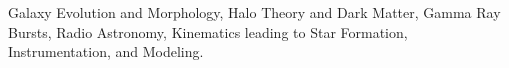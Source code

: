 \documentclass[a4paper,10pt]{article} %
\begin{document}
Galaxy Evolution and Morphology, Halo Theory and Dark Matter, Gamma Ray Bursts, Radio Astronomy, Kinematics leading to Star Formation, Instrumentation, and Modeling.



\newpage


\end{document}
